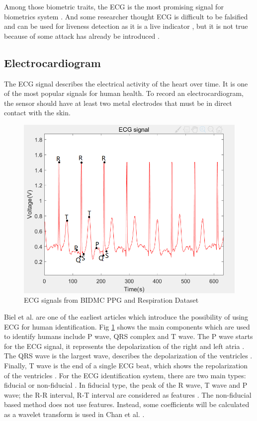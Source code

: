 \documentclass[a4paper,12pt]{article}
\begin{document}
Among those biometric traits, the ECG is the most promising signal for biometrics system \autocite{Pinto:2018evolution}. And some researcher thought ECG is difficult to be falsified and can be used for liveness detection as it is a live indicator \autocite{Wang:2007analysis}, but it is not true because of some attack has already be introduced \autocite{Eberz:2017broken,Karimian:2017vulnerability}. 

\subsection{Electrocardiogram}
The ECG signal describes the electrical activity of the heart over time. It is one of the most popular signals for human health. To record an electrocardiogram, the sensor should have at least two metal electrodes that must be in direct contact with the skin\autocite {Blasco:2018feasibility}.

\begin{figure}[H]
\centering
\includegraphics[width = .8\textwidth]{ecg.PNG}
\caption{ECG signals from BIDMC PPG and Respiration Dataset \autocite{PhysioNet}}
\label{fig:ecg}
\end{figure}

Biel et al. \autocite{Biel:2001ecg} are one of the earliest articles which introduce the possibility of using ECG for human identification. Fig \ref{fig:ecg} shows the main components which are used to identify humans include P wave, QRS complex and T wave. The P wave starts for the ECG signal, it represents the depolarization of the right and left atria \autocite{Agrafioti:2011heart}. The QRS wave is the largest wave, describes the depolarization of the ventricles \autocite{Wiki:ecg}. Finally, T wave is the end of a single ECG beat, which shows the repolarization of the ventricles \autocite{Lilly:2012pathophysiology}. For the ECG identification system, there are two main types: fiducial or non-fiducial \autocite{Agrafioti:2012secure}. In fiducial type, the peak of the R wave, T wave and P wave; the R-R interval, R-T interval are considered as features \autocite{Odinaka:2012analysis}. The non-fiducial based method does not use features. Instead, some coefficients will be calculated as a wavelet transform is used in Chan et al.  \autocite{Chan2008wavelet}.
\end{document}

